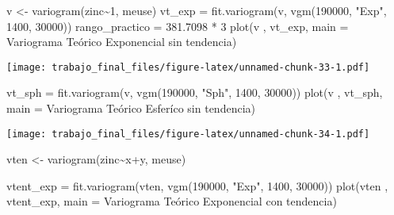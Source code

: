 \documentclass[
  12pt,
]{article}
\newenvironment{Shaded}{\begin{snugshade}}{\end{snugshade}}
\newcommand{\AttributeTok}[1]{\textcolor[rgb]{0.77,0.63,0.00}{#1}}
\newcommand{\DecValTok}[1]{\textcolor[rgb]{0.00,0.00,0.81}{#1}}
\newcommand{\FloatTok}[1]{\textcolor[rgb]{0.00,0.00,0.81}{#1}}
\newcommand{\FunctionTok}[1]{\textcolor[rgb]{0.00,0.00,0.00}{#1}}
\newcommand{\NormalTok}[1]{#1}
\newcommand{\OtherTok}[1]{\textcolor[rgb]{0.56,0.35,0.01}{#1}}
\newcommand{\SpecialCharTok}[1]{\textcolor[rgb]{0.00,0.00,0.00}{#1}}
\newcommand{\StringTok}[1]{\textcolor[rgb]{0.31,0.60,0.02}{#1}}
\begin{document}
\begin{Shaded}
\begin{Highlighting}[]
\NormalTok{v }\OtherTok{\textless{}{-}} \FunctionTok{variogram}\NormalTok{(zinc}\SpecialCharTok{\textasciitilde{}}\DecValTok{1}\NormalTok{, meuse)}
\NormalTok{vt\_exp }\OtherTok{=} \FunctionTok{fit.variogram}\NormalTok{(v, }\FunctionTok{vgm}\NormalTok{(}\DecValTok{190000}\NormalTok{, }\StringTok{"Exp"}\NormalTok{, }\DecValTok{1400}\NormalTok{, }\DecValTok{30000}\NormalTok{))}
\NormalTok{rango\_practico }\OtherTok{=} \FloatTok{381.7098} \SpecialCharTok{*} \DecValTok{3}
\FunctionTok{plot}\NormalTok{(v , vt\_exp, }\AttributeTok{main =} \StringTok{\textquotesingle{}Variograma Teórico Exponencial sin tendencia\textquotesingle{}}\NormalTok{)}
\end{Highlighting}
\end{Shaded}

\texttt{[image: trabajo\_final\_files/figure-latex/unnamed-chunk-33-1.pdf]}

\begin{Shaded}
\begin{Highlighting}[]
\NormalTok{vt\_sph }\OtherTok{=} \FunctionTok{fit.variogram}\NormalTok{(v, }\FunctionTok{vgm}\NormalTok{(}\DecValTok{190000}\NormalTok{, }\StringTok{"Sph"}\NormalTok{, }\DecValTok{1400}\NormalTok{, }\DecValTok{30000}\NormalTok{))}
\FunctionTok{plot}\NormalTok{(v , vt\_sph, }\AttributeTok{main =} \StringTok{\textquotesingle{}Variograma Teórico Esferíco sin tendencia\textquotesingle{}}\NormalTok{)}
\end{Highlighting}
\end{Shaded}

\texttt{[image: trabajo\_final\_files/figure-latex/unnamed-chunk-34-1.pdf]}

\begin{Shaded}
\begin{Highlighting}[]
\NormalTok{vten }\OtherTok{\textless{}{-}} \FunctionTok{variogram}\NormalTok{(zinc}\SpecialCharTok{\textasciitilde{}}\NormalTok{x}\SpecialCharTok{+}\NormalTok{y, meuse)}
\end{Highlighting}
\end{Shaded}

\begin{Shaded}
\begin{Highlighting}[]
\NormalTok{vtent\_exp }\OtherTok{=} \FunctionTok{fit.variogram}\NormalTok{(vten, }\FunctionTok{vgm}\NormalTok{(}\DecValTok{190000}\NormalTok{, }\StringTok{"Exp"}\NormalTok{, }\DecValTok{1400}\NormalTok{, }\DecValTok{30000}\NormalTok{))}
\FunctionTok{plot}\NormalTok{(vten , vtent\_exp, }\AttributeTok{main =} \StringTok{\textquotesingle{}Variograma Teórico Exponencial con tendencia\textquotesingle{}}\NormalTok{)}
\end{Highlighting}
\end{Shaded}
\end{document}

